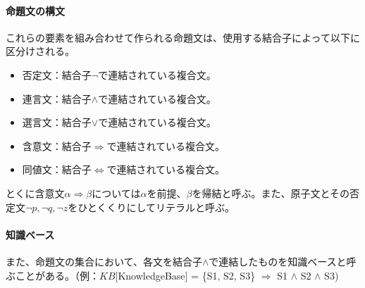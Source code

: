 \documentclass[dvipdfmx]{jsarticle}
\begin{document}
  \paragraph{命題文の構文}
  これらの要素を組み合わせて作られる命題文は、使用する結合子によって以下に区分けされる。
  \begin{itemize}
    \item 否定文：結合子$\neg$で連結されている複合文。
    \item 連言文：結合子$\wedge$で連結されている複合文。
    \item 選言文：結合子$\vee$で連結されている複合文。
    \item 含意文：結合子$\Rightarrow$で連結されている複合文。
    \item 同値文：結合子$\Leftrightarrow$で連結されている複合文。
  \end{itemize}
  とくに含意文$\alpha \Rightarrow \beta$については$\alpha$を前提、$\beta$を帰結と呼ぶ。また、原子文とその否定文$\neg p, \neg q, \neg z$をひとくくりにしてリテラルと呼ぶ。
  \paragraph{知識ベース}また、命題文の集合において、各文を結合子$\wedge$で連結したものを知識ベースと呼ぶことがある。（例：$KB$[KnowledgeBase] = \{S1, S2, S3\} $\Rightarrow$ S1 $\wedge$ S2 $\wedge$ S3)
\end{document}
